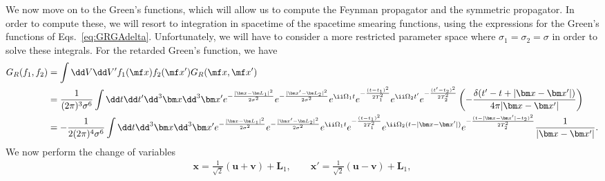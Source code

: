 We now move on to the Green's functions, which will allow us to compute the Feynman propagator and the symmetric propagator. In order to compute these, we will resort to integration in spacetime of the spacetime smearing functions, using the expressions for the Green's functions of Eqs.~\eqref{eq:GRGAdelta}. Unfortunately, we will have to consider a more restricted parameter space where $\sigma_1 = \sigma_2 = \sigma$ in order to solve these integrals. For the retarded Green's function, we have{\footnotesize
\begin{align}
    G_R(f_1,f_2) &= \int \dd V\dd V' f_1(\mf x) f_2(\mf x') G_R(\mf x,\mf x')\\
    & = \frac{1}{(2\pi)^3 \sigma^6} \int \dd t \dd t' \dd^3\bm x \dd^3 \bm x' e^{- \frac{|\bm x - \bm L_1|^2}{2\sigma^2}}e^{- \frac{|\bm x' - \bm L_2|^2}{2\sigma^2}} e^{\ii \Omega_1 t} e^{- \frac{(t-t_1)^2}{2T_1^2}}e^{\ii \Omega_2 t'} e^{- \frac{(t'-t_2)^2}{2T_2^2}}\left(- \frac{\delta(t' - t + |\bm x - \bm x'|)}{4\pi|\bm x-\bm x'|} \right)\nonumber\\
    & = -\frac{1}{2(2\pi)^4 \sigma^6} \int \dd t  \dd^3\bm x \dd^3 \bm x' e^{- \frac{|\bm x - \bm L_1|^2}{2\sigma^2}}e^{- \frac{|\bm x' - \bm L_2|^2}{2\sigma^2}} e^{\ii \Omega_1 t} e^{- \frac{(t-t_1)^2}{2T_1^2}}e^{\ii \Omega_2 (t - |\bm x - \bm x'|)} e^{- \frac{(t - |\bm x - \bm x'|-t_2)^2}{2T_2^2}}\frac{1}{|\bm x - \bm x'|}.\nonumber
\end{align}}
We now perform the change of variables
\begin{align}
    \bm x = \frac{1}{\sqrt{2}}(\bm u +\bm v) + \bm L_1, \quad\quad
    \bm x' = \frac{1}{\sqrt{2}}(\bm u -\bm v) + \bm L_1,
\end{align}
